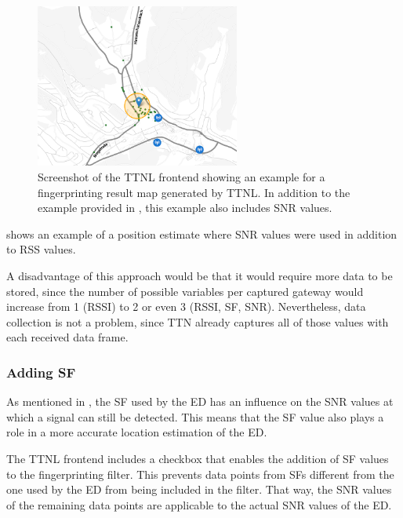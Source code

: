 \begin{figure}[htbp]
    \centering
    \includegraphics[width=0.6\textwidth]{pictures/ttn-locator/frontend/fingerprinting/fingerprinting_map_example_with_snr.png}
    \caption[Example for a fingerprinting result map generated by \acl{TTNL} with \acl{RSS} and \acl{SNR} values]{
        Screenshot of the \ac{TTNL} frontend showing an example for a fingerprinting result map generated by \ac{TTNL}.
        In addition to the example provided in , this example also includes \ac{SNR} values.
    }\label{fig:fingerprinting-map-example-with-snr}
\end{figure}

 shows an example of a position estimate where \ac{SNR} values were used in addition to \ac{RSS} values.

A disadvantage of this approach would be that it would require more data to be stored, since the number of possible variables per captured gateway would increase from 1 (\ac{RSSI}) to 2 or even 3 (\ac{RSSI}, \ac{SF}, \ac{SNR}).
Nevertheless, data collection is not a problem, since \ac{TTN} already captures all of those values with each received data frame.

\subsubsection{Adding \acl{SF}}

As mentioned in , the \ac{SF} used by the \acl{ED} has an influence on the \ac{SNR} values at which a signal can still be detected.
This means that the \ac{SF} value also plays a role in a more accurate location estimation of the \acl{ED}.

The \ac{TTNL} frontend includes a checkbox that enables the addition of \ac{SF} values to the fingerprinting filter.
This prevents data points from \acp{SF} different from the one used by the \acl{ED} from being included in the filter.
That way, the \ac{SNR} values of the remaining data points are applicable to the actual \ac{SNR} values of the \acl{ED}.

